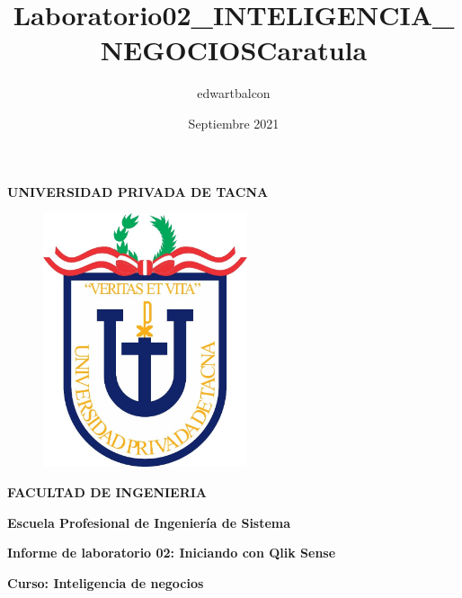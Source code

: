 \documentclass{article}
\title{Laboratorio02_INTELIGENCIA_NEGOCIOS}
\author{edwartbalcon}
\date{Septiembre 2021}
\begin{document}
\title{Caratula}

\begin{titlepage}
\begin{center}
\begin{Large}
\textbf{UNIVERSIDAD PRIVADA DE TACNA} \\
\end{Large}
\vspace*{-0.025in}
\begin{figure}[htb]
\begin{center}
\includegraphics[width=6cm]{./images/logo_UPT}
\end{center}
\end{figure}
\vspace*{-0.025in}
\begin{Large}
\textbf{FACULTAD DE INGENIERIA} \\
\end{Large}
\vspace*{0.05in}
\begin{Large}
\textbf{Escuela Profesional de Ingeniería de Sistema} \\
\end{Large}


\vspace*{0.4in}

\vspace*{0.1in}
\begin{Large}
\textbf{Informe de laboratorio 02: Iniciando con Qlik Sense} \\
\end{Large}

\vspace*{0.3in}
\begin{Large}
\textbf{Curso: Inteligencia de negocios} \\
\end{Large}


\end{center}
\end{titlepage}
\end{document}

